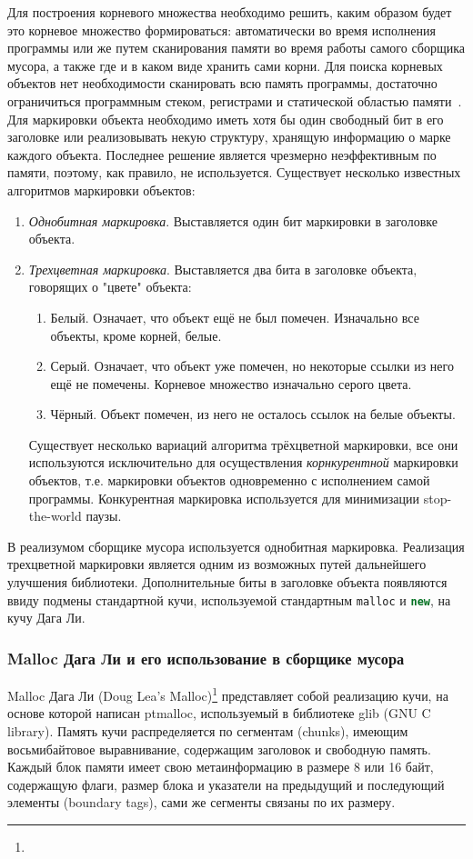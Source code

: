 Для построения корневого множества необходимо решить, каким образом будет это корневое множество формироваться:
автоматически во время исполнения программы или же путем сканирования памяти
во время работы самого сборщика мусора, а также где и в каком виде хранить сами корни.
Для поиска корневых объектов нет необходимости сканировать всю память программы, достаточно ограничиться
программным стеком, регистрами и статической областью памяти~\cite{myCoursePaper}.
Для маркировки объекта необходимо иметь хотя бы один свободный бит в его заголовке или реализовывать некую структуру,
хранящую информацию о марке каждого объекта. Последнее решение является чрезмерно неэффективным по памяти, поэтому,
как правило, не используется. Существует несколько известных алгоритмов маркировки объектов:
\begin{enumerate}
\item \textit{Однобитная маркировка}. Выставляется один бит маркировки в заголовке объекта.
\item \textit{Трехцветная маркировка}. Выставляется два бита в заголовке объекта, говорящих о "цвете" объекта:
	\begin{enumerate}
	\item Белый. Означает, что объект ещё не был помечен. Изначально все объекты, кроме корней, белые.
	\item Серый. Означает, что объект уже помечен, но некоторые ссылки из него ещё не помечены. Корневое множество
		изначально серого цвета.
	\item Чёрный. Объект помечен, из него не осталось ссылок на белые объекты.
	\end{enumerate}
Существует несколько вариаций алгоритма трёхцветной маркировки, все они используются
исключительно для осуществления \textit{корнкурентной} маркировки объектов, т.е. маркировки объектов одновременно
с исполнением самой программы. Конкурентная маркировка используется для минимизации stop-the-world паузы.
\end{enumerate}
В реализумом сборщике мусора используется однобитная маркировка.
Реализация трехцветной маркировки является одним из возможных путей дальнейшего улучшения библиотеки.
Дополнительные биты в заголовке объекта появляются ввиду подмены стандартной кучи, используемой стандартным
\lstinline[language= cpp]{malloc} и \lstinline[language= cpp]{new}, на кучу Дага Ли.

\subsubsection{Malloc Дага Ли и его использование в сборщике мусора}
Malloc Дага Ли (Doug Lea's Malloc)\footnote{}
представляет собой реализацию кучи, на основе которой
написан ptmalloc, используемый в библиотеке glib (GNU C library). Память кучи распределяется по сегментам (chunks), имеющим
восьмибайтовое выравнивание, содержащим заголовок и свободную память. Каждый блок памяти имеет свою метаинформацию в размере
8 или 16 байт, содержащую флаги, размер блока и указатели на предыдущий и последующий элементы (boundary tags),
сами же сегменты связаны по их размеру.

